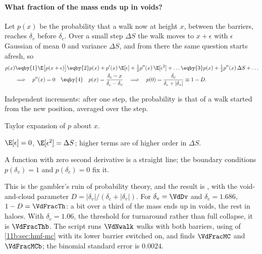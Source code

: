 \paragraph{What fraction of the mass ends up in voids?}
Let $p(x)$ be the probability that a walk now at height $x$, between the barriers,
reaches $\delta_v$ before $\delta_c$. Over a small step $\Delta S$ the walk moves to
$x+\epsilon$ with $\epsilon$ Gaussian of mean $0$ and variance $\Delta S$, and
from there the same question starts afresh, so
\begin{align}
  p(x)
  &\eqby{1}\E\bigl[p(x+\epsilon)\bigr]
   \eqby{2}p(x)+p'(x)\,\E[\epsilon]+\tfrac12p''(x)\,\E[\epsilon^2]+\dots
   \eqby{3}p(x)+\tfrac12p''(x)\,\Delta S+\dots\nonumber\\
  &\Longrightarrow\quad p''(x)=0
   \quad\eqby{4}\quad p(x)=\frac{\delta_c-x}{\delta_c-\delta_v}
   \quad\Longrightarrow\quad
   p(0)=\frac{\delta_c}{\delta_c+|\delta_v|}\equiv1-D .
  \label{11b:eq:ruin}
\end{align}
\begin{explain}
  \item Independent increments: after one step, the probability is that of
        a walk started from the new position, averaged over the step.
  \item Taylor expansion of $p$ about $x$.
  \item $\E[\epsilon]=0$, $\E[\epsilon^2]=\Delta S$; higher terms are of higher order
        in $\Delta S$.
  \item A function with zero second derivative is a straight line; the boundary
        conditions $p(\delta_v)=1$ and $p(\delta_c)=0$ fix it.
\end{explain}
This is the gambler's ruin of probability theory, and the result is
, with the void-and-cloud parameter
$D=|\delta_v|/(\delta_c+|\delta_v|)$. For $\delta_v=\VdDv$ and $\delta_c=1.686$,
$1-D=\VdFracTh$: a bit over a third of the mass ends up in voids, the rest in
haloes. With $\delta_c=1.06$, the threshold for turnaround rather than full
collapse, it is $\VdFracThb$. The script  runs $\VdNwalk$ walks
with both barriers, using  of \cref{11b:sec:hmf-mc} with
its lower barrier switched on, and finds $\VdFracMC$ and $\VdFracMCb$; the binomial
standard error is $0.0024$.

